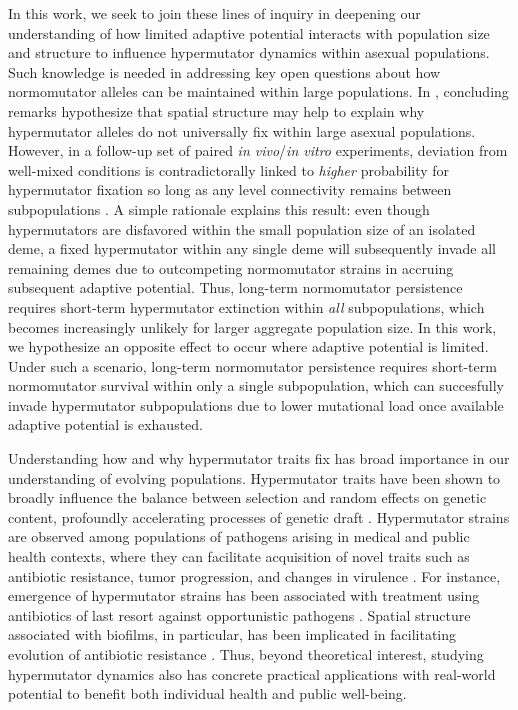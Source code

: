 In this work, we seek to join these lines of inquiry in deepening our understanding of how limited adaptive potential interacts with population size and structure to influence hypermutator dynamics within asexual populations.
Such knowledge is needed in addressing key open questions about how normomutator alleles can be maintained within large populations.
In \citep{raynes2018sign}, concluding remarks hypothesize that spatial structure may help to explain why hypermutator alleles do not universally fix within large asexual populations.
However, in a follow-up set of paired \textit{in vivo}/\textit{in vitro} experiments, deviation from well-mixed conditions is contradictorally linked to \textit{higher} probability for hypermutator fixation so long as any level connectivity remains between subpopulations \citep{raynes2019migration}.
A simple rationale explains this result: even though hypermutators are disfavored within the small population size of an isolated deme, a fixed hypermutator within any single deme will subsequently invade all remaining demes due to outcompeting normomutator strains in accruing subsequent adaptive potential.
Thus, long-term normomutator persistence requires short-term hypermutator extinction within \textit{all} subpopulations, which becomes increasingly unlikely for larger aggregate population size.
In this work, we hypothesize an opposite effect to occur where adaptive potential is limited.
Under such a scenario, long-term normomutator persistence requires short-term normomutator survival within only a single subpopulation, which can succesfully invade hypermutator subpopulations due to lower mutational load once available adaptive potential is exhausted.

Understanding how and why hypermutator traits fix has broad importance in our understanding of evolving populations.
Hypermutator traits have been shown to broadly influence the balance between selection and random effects on genetic content, profoundly accelerating processes of genetic draft \citep{couce2017mutator}.
Hypermutator strains are observed among populations of pathogens arising in medical and public health contexts, where they can facilitate acquisition of novel traits such as antibiotic resistance, tumor progression, and changes in virulence \citep{eliopoulos2003hypermutation,jolivetgougeon2011bacterial,stern2016viral,schlesner2015hypermutation,hammerstrom2015acinetobacter,perron2010hypermutability}.
For instance, emergence of hypermutator strains has been associated with treatment using antibiotics of last resort against opportunistic pathogens \citep{mehta2019essential}.
Spatial structure associated with biofilms, in particular, has been implicated in facilitating evolution of antibiotic resistance \citep{france2018spatial}.
Thus, beyond theoretical interest, studying hypermutator dynamics also has concrete practical applications with real-world potential to benefit both individual health and public well-being.

